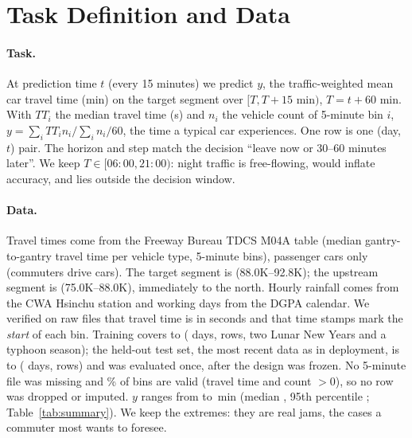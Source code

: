 \section{Task Definition and Data}\label{sec:task}
\paragraph{Task.} At prediction time $t$ (every 15 minutes) we predict $y$, the traffic-weighted
mean car travel time (min) on the target segment over $[T,T{+}15\text{ min})$, $T=t+60$ min. With
$\mathit{TT}_i$ the median travel time (s) and $n_i$ the vehicle count of 5-minute bin $i$,
$y=\sum_i \mathit{TT}_i n_i / \sum_i n_i / 60$, the time a typical car experiences. One row is one
(day, $t$) pair. The horizon and step match the decision ``leave now or 30--60 minutes later''.
We keep $T\in[06{:}00,21{:}00)$: night traffic is free-flowing, would inflate accuracy, and lies
outside the decision window.

\paragraph{Data.} Travel times come from the Freeway Bureau TDCS \textsc{M04A} table (median
gantry-to-gantry travel time per vehicle type, 5-minute bins), passenger cars only (commuters
drive cars). The target segment is  (88.0K--92.8K); the upstream segment is
 (75.0K--88.0K), immediately to the north. Hourly rainfall comes from the CWA
Hsinchu station and working days from the DGPA calendar. We verified on raw files that travel time
is in seconds and that time stamps mark the \emph{start} of each bin. Training covers
 to  ( days,  rows,
two Lunar New Years and a typhoon season); the held-out test set, the most recent data as in
deployment, is  to  ( days,
 rows) and was evaluated once, after the design was frozen. No 5-minute file
was missing and \% of bins are valid (travel time and count $>0$), so no row was
dropped or imputed. $y$ ranges from  to \,min (median , 95th
percentile ; Table~\ref{tab:summary}). We keep the extremes: they are real jams, the
cases a commuter most wants to foresee.

\begin{table}[t]\centering\small
{}
\caption{Summary statistics of the target and key features (training rows).}\label{tab:summary}
\end{table}
